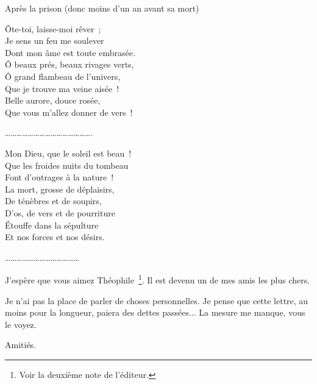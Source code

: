 \documentclass[french,twoside]{book} %
\newenvironment{quoteblock}%
  {\begin{quoting}}
  {\end{quoting}}
\newenvironment{quotebar}{%
    \def\FrameCommand{{\color{rubric!10!}\vrule width 0.5em} \hspace{0.9em}}%
    \def\OuterFrameSep{\itemsep} %
    \MakeFramed {\advance\hsize-\width \FrameRestore}
  }%
  {%
    \endMakeFramed
  }
\renewenvironment{quoteblock}%
  {%
    \savenotes
    \setstretch{0.9}
    \normalfont
    \begin{quotebar}
  }
  {%
    \end{quotebar}
    \spewnotes
  }
\begin{document}
\noindent Après la prison (donc moins d'un an avant sa mort)\par

\begin{quoteblock}
 \noindent Ôte-toi, laisse-moi rêver ; \\
Je sens un feu me soulever \\
Dont mon âme est toute embrasée. \\
Ô beaux prés, beaux rivages verts, \\
Ô grand flambeau de l'univers, \\
Que je trouve ma veine aisée ! \\
Belle aurore, douce rosée, \\
Que vous m'allez donner de vers !\par
 ……………………………………….\par
 Mon Dieu, que le soleil est beau ! \\
Que les froides nuits du tombeau \\
Font d'outrages à la nature ! \\
La mort, grosse de déplaisirs, \\
De ténèbres et de soupirs, \\
D'os, de vers et de pourriture \\
Étouffe dans la sépulture \\
Et nos forces et nos désirs.
 \end{quoteblock}

\noindent …………………………………\par
\par
J'espère que vous aimez Théophile \footnote{Voir la deuxième note de l'éditeur.}. Il est devenu un de mes amis les plus chers.\par
Je n'ai pas la place de parler de choses personnelles. Je pense que cette lettre, au moins pour la longueur, paiera des dettes passées... La mesure me manque, vous le voyez.\par
Amitiés.
\end{document}
